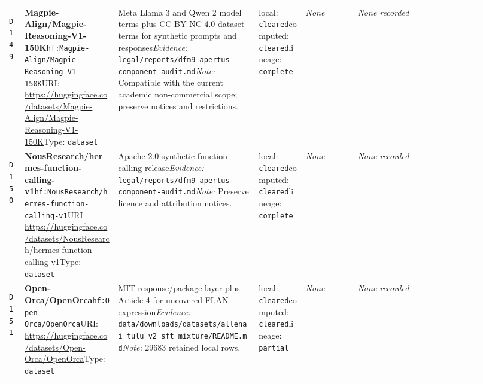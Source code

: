 \documentclass[9pt,a4paper]{article}
\newcommand{\depid}[1]{\hypertarget{dep:#1}{\texttt{#1}}}
\begin{document}
\begin{landscape}
\begin{longtable}{@{}L{0.035\linewidth}L{0.185\linewidth}L{0.27\linewidth}L{0.09\linewidth}L{0.10\linewidth}L{0.24\linewidth}@{}}
\depid{D149} & \textbf{Magpie-Align/Magpie-Reasoning-V1-150K}\newline \nolinkurl{hf:Magpie-Align/Magpie-Reasoning-V1-150K}\newline URI: \url{https://huggingface.co/datasets/Magpie-Align/Magpie-Reasoning-V1-150K}\newline Type: \texttt{dataset} & Meta Llama 3 and Qwen 2 model terms plus CC-BY-NC-4.0 dataset terms for synthetic prompts and responses\newline \textit{Evidence:} \nolinkurl{legal/reports/dfm9-apertus-component-audit.md}\newline \textit{Note:} Compatible with the current academic non-commercial scope; preserve notices and restrictions. & local: \texttt{cleared}\newline computed: \texttt{cleared}\newline lineage: \texttt{complete} & \textit{None} & \textit{None recorded} \\
\depid{D150} & \textbf{NousResearch/hermes-function-calling-v1}\newline \nolinkurl{hf:NousResearch/hermes-function-calling-v1}\newline URI: \url{https://huggingface.co/datasets/NousResearch/hermes-function-calling-v1}\newline Type: \texttt{dataset} & Apache-2.0 synthetic function-calling release\newline \textit{Evidence:} \nolinkurl{legal/reports/dfm9-apertus-component-audit.md}\newline \textit{Note:} Preserve licence and attribution notices. & local: \texttt{cleared}\newline computed: \texttt{cleared}\newline lineage: \texttt{complete} & \textit{None} & \textit{None recorded} \\
\depid{D151} & \textbf{Open-Orca/OpenOrca}\newline \nolinkurl{hf:Open-Orca/OpenOrca}\newline URI: \url{https://huggingface.co/datasets/Open-Orca/OpenOrca}\newline Type: \texttt{dataset} & MIT response/package layer plus Article 4 for uncovered FLAN expression\newline \textit{Evidence:} \nolinkurl{data/downloads/datasets/allenai_tulu_v2_sft_mixture/README.md}\newline \textit{Note:} 29683 retained local rows. & local: \texttt{cleared}\newline computed: \texttt{cleared}\newline lineage: \texttt{partial} & \textit{None} & \textit{None recorded} \\

\end{longtable}
\end{landscape}
\end{document}
